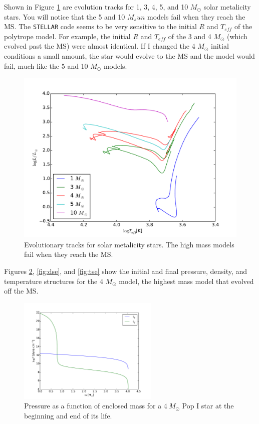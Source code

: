 \documentclass[12pt]{paper}
\begin{document}
Shown in Figure \ref{fig:HR} are evolution tracks for 1, 3, 4, 5, and 10 $M_\odot$ solar metalicity stars. You will notice that the 5 and 10 $M_sun$ models fail when they reach the MS. The \texttt{STELLAR} code seems to be very sensitive to the initial $R$ and $T_{eff}$ of the polytrope model. For example, the initial $R$ and $T_{eff}$ of the 3 and 4 $M_\odot$ (which evolved past the MS) were almost identical. If I changed the 4 $M_\odot$ initial conditions a small amount, the star would evolve to the MS and the model would fail, much like the 5 and 10 $M_\odot$ models. 

\begin{figure}
\begin{center}
    \includegraphics[width=\textwidth]{HR.pdf}
    \caption{Evolutionary tracks for solar metalicity stars. The high mass models fail when they reach the MS. }
    \label{fig:HR}
\end{center}
\end{figure}

Figures \ref{fig:pse}, \ref{fig:dse}, and \ref{fig:tse} show the initial and final pressure, density, and temperature structures for the 4 $M_\odot$ model, the highest mass model that evolved off the MS.

\begin{figure}
\begin{center}
    \includegraphics[width=0.6\textwidth]{pres.pdf}
    \caption{Pressure as a function of enclosed mass for a $4~M_\odot$ Pop I star at the beginning and end of its life.}
    \label{fig:pse}
\end{center}
\end{figure}
\end{document}
